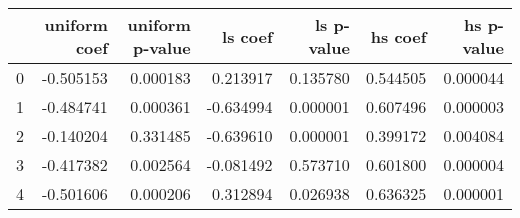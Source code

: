 \begin{tabular}{lrrrrrr}
\toprule
 & uniform coef & uniform p-value & ls coef & ls p-value & hs coef & hs p-value \\
\midrule
0 & -0.505153 & 0.000183 & 0.213917 & 0.135780 & 0.544505 & 0.000044 \\
1 & -0.484741 & 0.000361 & -0.634994 & 0.000001 & 0.607496 & 0.000003 \\
2 & -0.140204 & 0.331485 & -0.639610 & 0.000001 & 0.399172 & 0.004084 \\
3 & -0.417382 & 0.002564 & -0.081492 & 0.573710 & 0.601800 & 0.000004 \\
4 & -0.501606 & 0.000206 & 0.312894 & 0.026938 & 0.636325 & 0.000001 \\
\bottomrule
\end{tabular}
